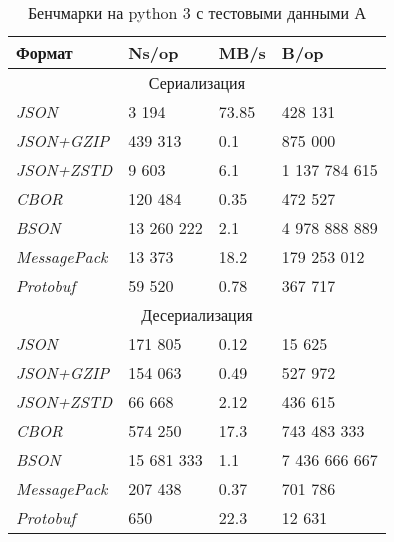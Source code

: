 \begin{table}[ht!]
\centering
\caption{Бенчмарки на python 3 с тестовыми данными А}
\begin{tabular}{|l|l|l|l|} 
\hline
\textbf{Формат}      & \textbf{Ns/op} & \textbf{MB/s} & \textbf{B/op}  \\ 
\hline
\multicolumn{4}{|c|}{Сериализация}                                        \\ 
\hline
\textit{JSON}        & 3 194      &    73.85         &    428 131 \\ 
\hline
\textit{JSON+GZIP}   & 439 313       &     0.1          &    875 000 \\ 
\hline
\textit{JSON+ZSTD}   & 9 603        &    6.1           &    1 137 784 615 \\ 
\hline
\textit{CBOR}        & 120 484       &    0.35           &   472 527 \\ 
\hline
\textit{BSON}        & 13 260 222      &    2.1           &    4 978 888 889    \\ 
\hline
\textit{MessagePack} & 13 373        &     18.2          &   179 253 012 \\ 
\hline
\textit{Protobuf}    & 59 520        &     0.78          &   367 717 \\ 
\hline
\multicolumn{4}{|c|}{Десериализация}                                      \\ 
\hline
\textit{JSON}        & 171 805       &    0.12           &   15 625 \\ 
\hline
\textit{JSON+GZIP}   & 154 063       &    0.49           &   527 972 \\ 
\hline
\textit{JSON+ZSTD}   & 66 668       &     2.12          &   436 615 \\ 
\hline
\textit{CBOR}        & 574 250       &     17.3          &   743 483 333 \\ 
\hline
\textit{BSON}        & 15 681 333      &     1.1          &  7 436 666 667   \\ 
\hline
\textit{MessagePack} & 207 438       &     0.37          &   701 786 \\ 
\hline
\textit{Protobuf}    & 650         &     22.3           &   12 631 \\
\hline
\end{tabular}
\end{table}

